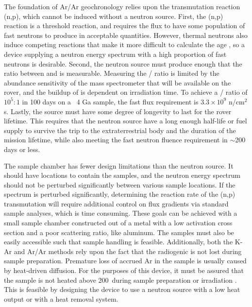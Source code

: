 \documentclass{mc2015}
\begin{document}
The foundation of Ar/Ar geochronology relies upon the transmutation reaction (n,p), which cannot be induced without a neutron source. First, the (n,p) reaction is a threshold reaction, and requires the flux to have some population of fast neutrons to produce  in acceptable quantities. However, thermal neutrons also induce competing reactions that make it more difficult to calculate the age \cite{mcdougall_geochronology_1999}, so a device supplying a neutron energy spectrum with a high proportion of fast neutrons is desirable. Second, the neutron source must produce enough  that the ratio between  and  is measurable. Measuring the / ratio is limited by the abundance sensitivity of the mass spectrometer that will be available on the rover, and the buildup of  is dependent on irradiation time. To achieve a / ratio of $10^{5}:1$ in 100 days on a ~4 Ga sample, the fast flux requirement is $3.3\times10^9$ n/cm$^2$s. Lastly, the source must have some degree of longevity to last for the rover lifetime. This requires that the neutron source have a long enough half-life or fuel supply to survive the trip to the extraterrestrial body and the duration of the mission lifetime, while also meeting the fast neutron fluence requirement in $\sim$200 days or less.   

The sample chamber has fewer design limitations than the neutron source. It should have locations to contain the samples, and the neutron energy spectrum should not be perturbed significantly between various sample locations. If the spectrum is perturbed significantly, determining the reaction rate of the (n,p) transmutation will require additional control on flux gradients via standard sample analyses, which is time consuming. These goals can be achieved with a small sample chamber constructed out of a metal with a low activation cross section and a poor scattering ratio, like aluminum. The samples must also be easily accessible such that sample handling is feasible. Additionally, both the K-Ar and Ar/Ar methods rely upon the fact that the radiogenic  is not lost during sample preparation. Premature loss of accrued Ar in the sample is usually caused by heat-driven diffusion. For the purposes of this device, it must be assured that the sample is not heated above 200\celsius\ during sample preparation or irradiation \cite{mcdougall_geochronology_1999}. This is feasible by designing the device to use a neutron source with a low heat output or with a heat removal system.
\end{document}
